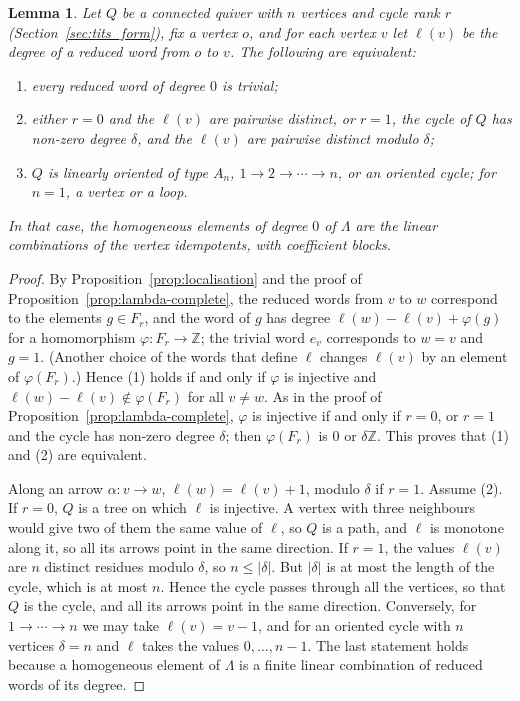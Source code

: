 \documentclass[12pt, a4paper]{report}
\theoremstyle{plain}
\newtheorem{lemma}[theorem]{Lemma}
\theoremstyle{definition}
\theoremstyle{remark}
\theoremstyle{plain}
\newcommand{\ZZ}{\mathbb{Z}}
\begin{document}
\begin{lemma}\label{lem:degree-zero}
Let $Q$ be a connected quiver with $n$ vertices and cycle rank $r$ (Section~\ref{sec:tits_form}), fix a vertex $o$, and for each vertex $v$ let $\ell(v)$ be the degree of a reduced word from $o$ to $v$. The following are equivalent:
\begin{enumerate}
  \item every reduced word of degree $0$ is trivial;
  \item either $r=0$ and the $\ell(v)$ are pairwise distinct, or $r=1$, the cycle of $Q$ has non-zero degree $\delta$, and the $\ell(v)$ are pairwise distinct modulo $\delta$;
  \item $Q$ is linearly oriented of type $A_n$, $1\to2\to\cdots\to n$, or an oriented cycle; for $n=1$, a vertex or a loop.
\end{enumerate}
In that case, the homogeneous elements of degree $0$ of $\Lambda$ are the linear combinations of the vertex idempotents, with coefficient blocks.
\end{lemma}
\begin{proof}
By Proposition~\ref{prop:localisation} and the proof of Proposition~\ref{prop:lambda-complete}, the reduced words from $v$ to $w$ correspond to the elements $g\in F_r$, and the word of $g$ has degree $\ell(w)-\ell(v)+\varphi(g)$ for a homomorphism $\varphi:F_r\to\ZZ$; the trivial word $e_v$ corresponds to $w=v$ and $g=1$. (Another choice of the words that define $\ell$ changes $\ell(v)$ by an element of $\varphi(F_r)$.) Hence (1) holds if and only if $\varphi$ is injective and $\ell(w)-\ell(v)\notin\varphi(F_r)$ for all $v\neq w$. As in the proof of Proposition~\ref{prop:lambda-complete}, $\varphi$ is injective if and only if $r=0$, or $r=1$ and the cycle has non-zero degree $\delta$; then $\varphi(F_r)$ is $0$ or $\delta\ZZ$. This proves that (1) and (2) are equivalent.

Along an arrow $\alpha:v\to w$, $\ell(w)=\ell(v)+1$, modulo $\delta$ if $r=1$. Assume (2). If $r=0$, $Q$ is a tree on which $\ell$ is injective. A vertex with three neighbours would give two of them the same value of $\ell$, so $Q$ is a path, and $\ell$ is monotone along it, so all its arrows point in the same direction. If $r=1$, the values $\ell(v)$ are $n$ distinct residues modulo $\delta$, so $n\leq|\delta|$. But $|\delta|$ is at most the length of the cycle, which is at most $n$. Hence the cycle passes through all the vertices, so that $Q$ is the cycle, and all its arrows point in the same direction. Conversely, for $1\to\cdots\to n$ we may take $\ell(v)=v-1$, and for an oriented cycle with $n$ vertices $\delta=n$ and $\ell$ takes the values $0,\dots,n-1$. The last statement holds because a homogeneous element of $\Lambda$ is a finite linear combination of reduced words of its degree.
\end{proof}
\end{document}
